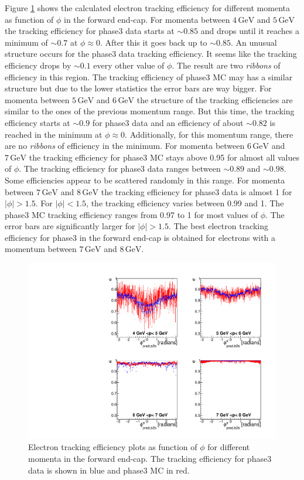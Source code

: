 \documentclass[a4paper,11pt,twosided,final,german,openbib,pdftex,listof=totoc,bibliography=totoc]{scrbook}
\begin{document}
Figure \ref{plt:xPMPhiemFC3} shows the calculated electron tracking efficiency for different momenta as function of $\phi$ in the forward end-cap.
For momenta between $4\,\textrm{GeV}$ and $5\,\textrm{GeV}$ the tracking efficiency for phase3 data starts at $\sim 0.85$ and drops until it reaches a minimum of $\sim 0.7$ at $\phi \approx 0$. After this it goes back up to $\sim 0.85$. An unusual structure occurs for the phase3 data tracking efficiency. It seems like the tracking efficiency drops by $\sim 0.1$ every other value of $\phi$. The result are two \textit{ribbons} of efficiency in this region. The tracking efficiency of phase3 MC may has a similar structure but due to the lower statistics the error bars are way bigger.
For momenta between $5\,\textrm{GeV}$ and $6\,\textrm{GeV}$ the structure of the tracking efficiencies are similar to the ones of the previous momentum range. But this time, the tracking efficiency starts at $\sim 0.9$ for phase3 data and an efficiency of about $\sim 0.82$ is reached in the minimum at $\phi \approx 0$. Additionally, for this momentum range, there are no \textit{ribbons} of efficiency in the minimum.
For momenta between $6\,\textrm{GeV}$ and $7\,\textrm{GeV}$ the tracking efficiency for phase3 MC stays above 0.95 for almost all values of $\phi$. The tracking efficiency for phase3 data ranges between $\sim 0.89$ and $\sim 0.98$. Some efficiencies appear to be scattered randomly in this range.
For momenta between $7\,\textrm{GeV}$ and $8\,\textrm{GeV}$ the tracking efficiency for phase3 data is almost 1 for $|\phi| > 1.5$. For $|\phi| < 1.5$, the tracking efficiency varies between 0.99 and 1. The phase3 MC tracking efficiency ranges from 0.97 to 1 for most values of $\phi$. The error bars are significantly larger for $|\phi| > 1.5$.
The best electron tracking efficiency for phase3 in the forward end-cap is obtained for electrons with a momentum between $7\,\textrm{GeV}$ and $8\,\textrm{GeV}$.

\begin{figure}[!htbp]
	\centering
	\includegraphics[width=\textwidth]{Plots/master3/xPMPhiemFCP3}
	\caption[Momentum $\phi$ Electron Forward End-Cap Efficiency Phase3]{Electron tracking efficiency plots as function of $\phi$ for different momenta in the forward end-cap. The tracking efficiency for phase3 data is shown in blue and phase3 MC in red.}
	\label{plt:xPMPhiemFC3}
\end{figure}
\end{document}
